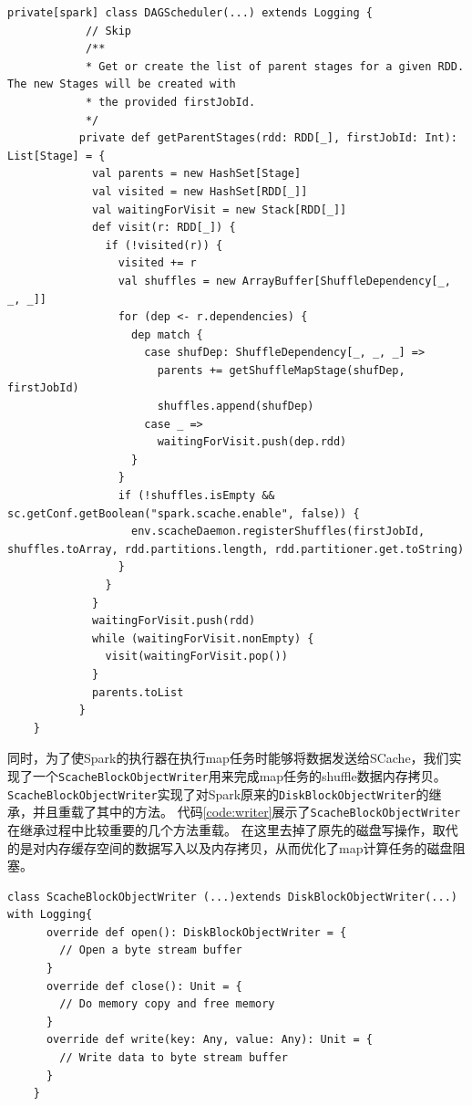 \begin{lstlisting}[style={myScalastyle}, caption={DAGScheduler代码片段}, label={code:dagScheduler}]
    private[spark] class DAGScheduler(...) extends Logging {
            // Skip
            /**
            * Get or create the list of parent stages for a given RDD.  The new Stages will be created with
            * the provided firstJobId.
            */
           private def getParentStages(rdd: RDD[_], firstJobId: Int): List[Stage] = {
             val parents = new HashSet[Stage]
             val visited = new HashSet[RDD[_]]
             val waitingForVisit = new Stack[RDD[_]]
             def visit(r: RDD[_]) {
               if (!visited(r)) {
                 visited += r
                 val shuffles = new ArrayBuffer[ShuffleDependency[_, _, _]]
                 for (dep <- r.dependencies) {
                   dep match {
                     case shufDep: ShuffleDependency[_, _, _] =>
                       parents += getShuffleMapStage(shufDep, firstJobId)
                       shuffles.append(shufDep)
                     case _ =>
                       waitingForVisit.push(dep.rdd)
                   }
                 }
                 if (!shuffles.isEmpty && sc.getConf.getBoolean("spark.scache.enable", false)) {
                   env.scacheDaemon.registerShuffles(firstJobId, shuffles.toArray, rdd.partitions.length, rdd.partitioner.get.toString)
                 }
               }
             }
             waitingForVisit.push(rdd)
             while (waitingForVisit.nonEmpty) {
               visit(waitingForVisit.pop())
             }
             parents.toList
           }
    }
\end{lstlisting}

同时，为了使Spark的执行器在执行map任务时能够将数据发送给SCache，我们实现了一个\verb|ScacheBlockObjectWriter|用来完成map任务的shuffle数据内存拷贝。
\verb|ScacheBlockObjectWriter|实现了对Spark原来的\verb|DiskBlockObjectWriter|的继承，并且重载了其中的方法。
代码\ref{code:writer}展示了\verb|ScacheBlockObjectWriter|在继承过程中比较重要的几个方法重载。
在这里去掉了原先的磁盘写操作，取代的是对内存缓存空间的数据写入以及内存拷贝，从而优化了map计算任务的磁盘阻塞。

\begin{lstlisting}[style={myScalastyle}, caption={ScacheBlockObjectWriter代码片段}, label={code:writer}]
    class ScacheBlockObjectWriter (...)extends DiskBlockObjectWriter(...) with Logging{
      override def open(): DiskBlockObjectWriter = {
        // Open a byte stream buffer
      }
      override def close(): Unit = {
        // Do memory copy and free memory
      }
      override def write(key: Any, value: Any): Unit = {
        // Write data to byte stream buffer
      }
    }
\end{lstlisting}

